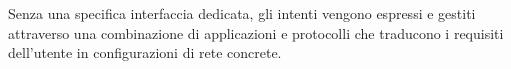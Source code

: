 \newline Senza una specifica interfaccia dedicata, gli intenti vengono espressi e gestiti attraverso una combinazione di applicazioni e protocolli che traducono i requisiti dell'utente in configurazioni di rete concrete.
